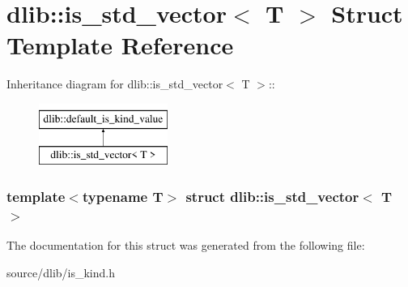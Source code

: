 \hypertarget{structdlib_1_1is__std__vector}{
\section{dlib::is\_\-std\_\-vector$<$ T $>$ Struct Template Reference}
\label{structdlib_1_1is__std__vector}
}
Inheritance diagram for dlib::is\_\-std\_\-vector$<$ T $>$::\begin{figure}[H]
\begin{center}
\leavevmode
\includegraphics[height=2cm]{structdlib_1_1is__std__vector}
\end{center}
\end{figure}
\subsubsection*{template$<$typename T$>$ struct dlib::is\_\-std\_\-vector$<$ T $>$}



The documentation for this struct was generated from the following file:\begin{DoxyCompactItemize}
\item 
source/dlib/is\_\-kind.h\end{DoxyCompactItemize}
